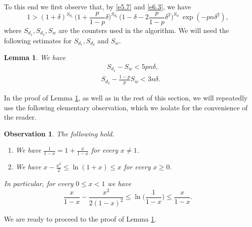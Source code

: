 \documentclass[10pt,a4paper]{amsart}
\newtheorem{lem}[thm]{Lemma}
\newtheorem{observation}[thm]{Observation}
\theoremstyle{remark}
\newcommand{\meg}{\geqslant}
\newcommand{\mik}{\leqslant}
\begin{document}
To this end we first observe that, by \eqref{e5.7} and \eqref{e6.3}, we have
\begin{equation} \label{e6.4}
1 >(1+\delta)^{S_{d_1}}\, \Big(1+\frac{p}{1-p}\delta\Big)^{S_{d_2}}\,
\Big(1-\delta-2\frac{p}{1-p}\delta^2\Big)^{S_w}\, \exp(-pn\delta^2),
\end{equation}
where $S_{d_1},S_{d_2},S_w$ are the counters used in the algorithm.
We will need the following estimates for $S_{d_1},S_{d_2}$ and $S_w$.
\begin{lem} \label{l6.1}
We have
\begin{align}
\label{e6.5} & \ \ \ \, S_{d_1}-S_w < 5pn\delta, \\
\label{e6.6} & S_{d_2} -\frac{1-p}{p}S_w  < 3n \delta.
\end{align}
\end{lem}
In the proof of Lemma \ref{l6.1}, as well as in the rest of this section, we will repeatedly use
the following elementary observation, which we isolate for the convenience of the reader.
\begin{observation} \label{o6.2}
The following hold.
\begin{enumerate}
\item[(i)] \label{i} We have $\frac{1}{1-x}=1+\frac{x}{1-x}$ for every $x\neq 1$.
\item[(ii)] \label{ii} We have $x-\frac{x^2}{2}\mik\ln(1+x)\mik x$ for every $x\meg 0$.
\end{enumerate}
In particular, for every $0\mik x <1$ we have
\begin{equation} \label{en.6.1}
\frac{x}{1-x} -\frac{x^2}{2(1-x)^2} \mik \ln\Big(\frac{1}{1-x}\Big) \mik \frac{x}{1-x}.
\end{equation}
\end{observation}
We are ready to proceed to the proof of Lemma \ref{l6.1}.
\end{document}

